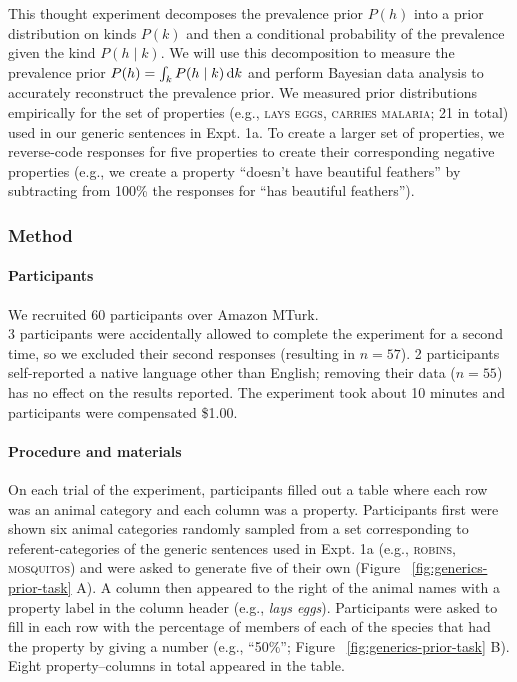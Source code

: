 \documentclass[english,floatsintext,man]{apa6}
\theoremstyle{definition}
\theoremstyle{definition}
\theoremstyle{definition}
\theoremstyle{remark}
\begin{document}
This thought experiment decomposes the prevalence prior \(P(h)\) into a
prior distribution on kinds \(P(k)\) and then a conditional probability
of the prevalence given the kind \(P(h \mid k)\). We will use this
decomposition to measure the prevalence prior
\(P(h) = \int_{k} P(h \mid k) \mathop{}\!\mathrm{d} k\) and perform Bayesian data
analysis to accurately reconstruct the prevalence prior. We measured
prior distributions empirically for the set of properties (e.g.,
\textsc{lays eggs, carries malaria}; 21 in total) used in our generic
sentences in Expt. 1a. To create a larger set of properties, we
reverse-code responses for five properties to create their corresponding
negative properties (e.g., we create a property \enquote{doesn't have
beautiful feathers} by subtracting from 100\% the responses for
\enquote{has beautiful feathers}).

\subsubsection{Method}\label{method-1}

\paragraph{Participants}\label{participants-1}

We recruited 60 participants over Amazon MTurk.\\
3 participants were accidentally allowed to complete the experiment for
a second time, so we excluded their second responses (resulting in
\(n=57\)). 2 participants self-reported a native language other than
English; removing their data (\(n=55\)) has no effect on the results
reported. The experiment took about 10 minutes and participants were
compensated \$1.00.

\paragraph{Procedure and materials}\label{procedure-and-materials-1}

On each trial of the experiment, participants filled out a table where
each row was an animal category and each column was a property.
Participants first were shown six animal categories randomly sampled
from a set corresponding to referent-categories of the generic sentences
used in Expt. 1a (e.g., \textsc{robins, mosquitos}) and were asked to
generate five of their own (Figure ~\ref{fig:generics-prior-task} A). A
column then appeared to the right of the animal names with a property
label in the column header (e.g., \emph{lays eggs}). Participants were
asked to fill in each row with the percentage of members of each of the
species that had the property by giving a number (e.g., \enquote{50\%};
Figure ~\ref{fig:generics-prior-task} B). Eight property--columns in
total appeared in the table.
\end{document}
